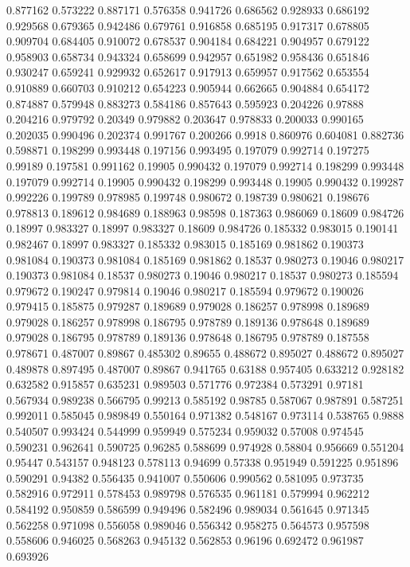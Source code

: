 0.877162 0.573222
0.887171 0.576358
0.941726 0.686562
0.928933 0.686192
0.929568 0.679365
0.942486 0.679761
0.916858 0.685195
0.917317 0.678805
0.909704 0.684405
0.910072 0.678537
0.904184 0.684221
0.904957 0.679122
0.958903 0.658734
0.943324 0.658699
0.942957 0.651982
0.958436 0.651846
0.930247 0.659241
0.929932 0.652617
0.917913 0.659957
0.917562 0.653554
0.910889 0.660703
0.910212 0.654223
0.905944 0.662665
0.904884 0.654172
0.874887 0.579948
0.883273 0.584186
0.857643 0.595923
0.204226 0.97888
0.204216 0.979792
0.20349 0.979882
0.203647 0.978833
0.200033 0.990165
0.202035 0.990496
0.202374 0.991767
0.200266 0.9918
0.860976 0.604081
0.882736 0.598871
0.198299 0.993448
0.197156 0.993495
0.197079 0.992714
0.197275 0.99189
0.197581 0.991162
0.19905 0.990432
0.197079 0.992714
0.198299 0.993448
0.197079 0.992714
0.19905 0.990432
0.198299 0.993448
0.19905 0.990432
0.199287 0.992226
0.199789 0.978985
0.199748 0.980672
0.198739 0.980621
0.198676 0.978813
0.189612 0.984689
0.188963 0.98598
0.187363 0.986069
0.18609 0.984726
0.18997 0.983327
0.18997 0.983327
0.18609 0.984726
0.185332 0.983015
0.190141 0.982467
0.18997 0.983327
0.185332 0.983015
0.185169 0.981862
0.190373 0.981084
0.190373 0.981084
0.185169 0.981862
0.18537 0.980273
0.19046 0.980217
0.190373 0.981084
0.18537 0.980273
0.19046 0.980217
0.18537 0.980273
0.185594 0.979672
0.190247 0.979814
0.19046 0.980217
0.185594 0.979672
0.190026 0.979415
0.185875 0.979287
0.189689 0.979028
0.186257 0.978998
0.189689 0.979028
0.186257 0.978998
0.186795 0.978789
0.189136 0.978648
0.189689 0.979028
0.186795 0.978789
0.189136 0.978648
0.186795 0.978789
0.187558 0.978671
0.487007 0.89867
0.485302 0.89655
0.488672 0.895027
0.488672 0.895027
0.489878 0.897495
0.487007 0.89867
0.941765 0.63188
0.957405 0.633212
0.928182 0.632582
0.915857 0.635231
0.989503 0.571776
0.972384 0.573291
0.97181 0.567934
0.989238 0.566795
0.99213 0.585192
0.98785 0.587067
0.987891 0.587251
0.992011 0.585045
0.989849 0.550164
0.971382 0.548167
0.973114 0.538765
0.9888 0.540507
0.993424 0.544999
0.959949 0.575234
0.959032 0.57008
0.974545 0.590231
0.962641 0.590725
0.96285 0.588699
0.974928 0.58804
0.956669 0.551204
0.95447 0.543157
0.948123 0.578113
0.94699 0.57338
0.951949 0.591225
0.951896 0.590291
0.94382 0.556435
0.941007 0.550606
0.990562 0.581095
0.973735 0.582916
0.972911 0.578453
0.989798 0.576535
0.961181 0.579994
0.962212 0.584192
0.950859 0.586599
0.949496 0.582496
0.989034 0.561645
0.971345 0.562258
0.971098 0.556058
0.989046 0.556342
0.958275 0.564573
0.957598 0.558606
0.946025 0.568263
0.945132 0.562853
0.96196 0.692472
0.961987 0.693926
